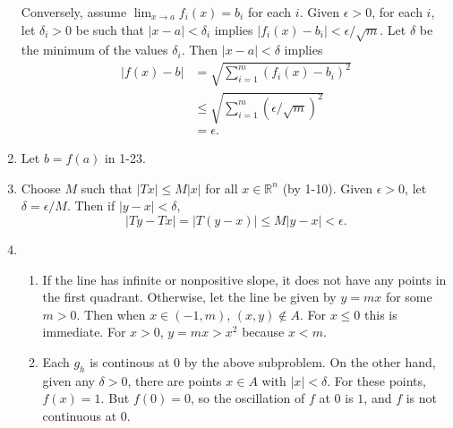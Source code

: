 \documentclass{article}
\begin{document}
\begin{enumerate}[label=\textbf{1-\arabic*.}]
Conversely, assume $\lim_{x\to a}f_i(x)= b_i$ for each $i$. Given $\epsilon > 0$, for each $i$, let $\delta_i > 0$ be such that $|x - a| < \delta_i$ implies $|f_i(x) - b_i| < \epsilon / \sqrt{m}$. Let $\delta$ be the minimum of the values $\delta_i$. Then $|x - a| < \delta$ implies 
\begin{align*}
|f(x) - b| &= \sqrt{\sum_{i=1}^m (f_i(x) - b_i)^2}\\
	&\leq \sqrt{\sum_{i=1}^m (\epsilon/\sqrt{m})^2}\\
	&= \epsilon.
\end{align*}
\item Let $b=f(a)$ in 1-23.
\item Choose $M$ such that $|Tx|\leq M|x|$ for all $x\in \mathbb R^n$ (by 1-10). Given $\epsilon > 0$, let $\delta = \epsilon/M$. Then if $|y-x| < \delta$, \[|Ty-Tx| = |T(y-x)| \leq M|y-x| < \epsilon.\]
\item
\begin{enumerate}
\item If the line has infinite or nonpositive slope, it does not have any points in the first quadrant. Otherwise, let the line be given by $y=mx$ for some $m>0$. Then when $x \in (-1,m)$, $(x,y)\notin A$. For $x \leq 0$ this is immediate. For $x > 0$, $y = mx > x^2$ because $x<m$.
\item Each $g_h$ is continous at $0$ by the above subproblem. On the other hand, given any $\delta > 0$, there are points $x\in A$ with $|x|<\delta$. For these points, $f(x) = 1$. But $f(0) = 0$, so the oscillation of $f$ at $0$ is $1$, and $f$ is not continuous at $0$.
\end{enumerate}
\end{enumerate}
\end{document}
